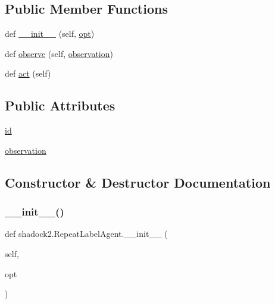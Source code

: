 \subsection*{Public Member Functions}
\begin{DoxyCompactItemize}
\item 
def \hyperlink{classshadock2_1_1RepeatLabelAgent_aaa95fcf81f5251f93425819c3683fe64}{\+\_\+\+\_\+init\+\_\+\+\_\+} (self, \hyperlink{classparlai_1_1core_1_1agents_1_1Agent_ab3b45d2754244608c75d4068b90cd051}{opt})
\item 
def \hyperlink{classshadock2_1_1RepeatLabelAgent_ade5633ad82b7dc87c7bb51bacb2591e5}{observe} (self, \hyperlink{classshadock2_1_1RepeatLabelAgent_af88efda5c17ebe03c85cc4b3446c1072}{observation})
\item 
def \hyperlink{classshadock2_1_1RepeatLabelAgent_a92d93b9cce5feb83096369a7d567624c}{act} (self)
\end{DoxyCompactItemize}
\subsection*{Public Attributes}
\begin{DoxyCompactItemize}
\item 
\hyperlink{classshadock2_1_1RepeatLabelAgent_a2f86c98e40c0ed00dce454230f6ea1b7}{id}
\item 
\hyperlink{classshadock2_1_1RepeatLabelAgent_af88efda5c17ebe03c85cc4b3446c1072}{observation}
\end{DoxyCompactItemize}


\subsection{Constructor \& Destructor Documentation}
\mbox{\label{classshadock2_1_1RepeatLabelAgent_aaa95fcf81f5251f93425819c3683fe64}} 
\subsubsection{\texorpdfstring{\+\_\+\+\_\+init\+\_\+\+\_\+()}{\_\_init\_\_()}}
{\footnotesize\ttfamily def shadock2.\+Repeat\+Label\+Agent.\+\_\+\+\_\+init\+\_\+\+\_\+ (\begin{DoxyParamCaption}\item[{}]{self,  }\item[{}]{opt }\end{DoxyParamCaption})}



